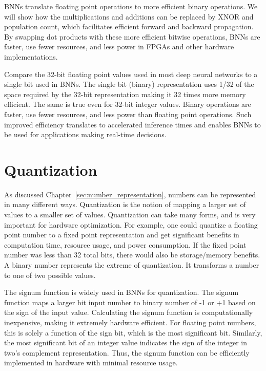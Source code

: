 BNNs translate floating point operations to more efficient binary operations. We will show how the multiplications and additions can be replaced by XNOR and population count, which facilitates efficient forward and backward propagation. By swapping dot products with these more efficient bitwise operations, BNNs are faster, use fewer resources, and less power in FPGAs and other hardware implementations. 

Compare the 32-bit floating point values used in most deep neural networks to a single bit used in BNNs. 
The single bit (binary) representation uses 1/32 of the space required by the 32-bit representation making it 32 times more memory efficient. 
The same is true even for 32-bit integer values. %
Binary operations are faster, use fewer resources, and less power than floating point operations. 
Such improved efficiency translates to accelerated inference times and enables BNNs to be used for applications making real-time decisions.

\section{Quantization}

As discussed Chapter~\ref{sec:number_representation}, numbers can be represented in many different ways. 
Quantization is the notion of mapping a larger set of values to a smaller set of values. 
Quantization can take many forms, and is very important for hardware optimization. 
For example, one could quantize a floating point number to a fixed point representation and get significant benefits in computation time, resource usage, and power consumption.
If the fixed point number was less than 32 total bits, there would also be storage/memory benefits.
A binary number represents the extreme of quantization.
It transforms a number to one of two possible values. 

The signum function is widely used in BNNs for quantization. The signum function maps a larger bit input number to binary number of -1 or +1 based on the sign of the input value. 
Calculating the signum function is computationally inexpensive, making it extremely hardware efficient.
For floating point numbers, this is solely a function of the sign bit, which is the most significant bit. 
Similarly, the most significant bit of an integer value indicates the sign of the integer in two's complement representation.
Thus, the signum function can be efficiently implemented in hardware with minimal resource usage.  

